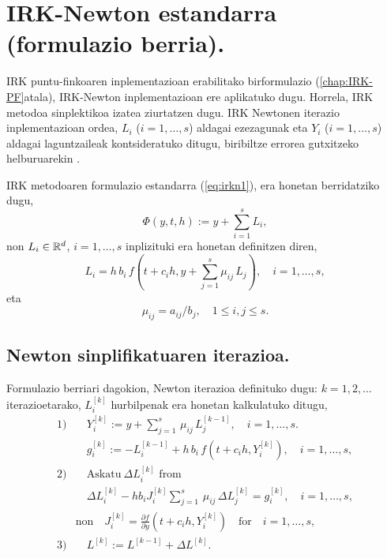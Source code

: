 \section{IRK-Newton estandarra (formulazio berria).}
\label{sec:7.4}

IRK puntu-finkoaren inplementazioan erabilitako birformulazio (\ref{chap:IRK-PF}atala), IRK-Newton inplementazioan ere aplikatuko dugu. Horrela, IRK metodoa sinplektikoa izatea ziurtatzen dugu. IRK Newtonen iterazio inplementazioan ordea, $L_i$ ($i=1,\dots,s$) aldagai ezezagunak eta $Y_i$ ($i=1,\dots,s$) aldagai laguntzaileak kontsideratuko ditugu, biribiltze errorea gutxitzeko helburuarekin \cite{Olsson2000}.

IRK metodoaren formulazio estandarra (\ref{eq:irkn1}), era honetan berridatziko dugu,
\begin{equation}
\label{eq:PhiIRK2}
\Phi(y,t,h) :=y + \sum_{i=1}^s L_{i},
\end{equation}
%
non $L_{i} \in \mathbb{R}^d$, $i=1,\ldots,s$ inplizituki era honetan definitzen diren,
%
\begin{equation}
\label{eq:L}
 L_{i} = h \, b_i \, f(t+c_i h, y+ \sum_{j=1}^s \mu_{ij}\,L_{j}), \quad  i=1 ,\ldots, s, 
\end{equation}
%
eta
%
\begin{equation*} 
\mu_{ij}=a_{ij}/b_j,  \quad 1 \leq i,j \leq s.
\end{equation*}
%
\subsection*{Newton sinplifikatuaren iterazioa.}

Formulazio berriari dagokion, Newton iterazioa definituko dugu:  $k=1,2,\dots$ iterazioetarako, $L_i^{[k]}$ hurbilpenak era honetan kalkulatuko ditugu,
\begin{equation}
\label{eq:Newton_iteration2}
\begin{split}
1) 
   & \quad Y_i^{[k]} := y+\sum_{j=1}^{s}\, \mu_{ij}\, L_{j}^{[k-1]}, \quad  i=1 ,\ldots, s. \\
   & \quad g_i^{[k]} := -L_{i}^{[k-1]}  + h \, b_i\, f(t+c_i h,  Y_i^{[k]}), \quad  i=1 ,\ldots, s, \\   
2) & \quad \mathrm{Askatu \ } \Delta L_{i}^{[k]} \mbox{\  from \ } \\
   & \quad \Delta L_{i}^{[k]}  - h b_i J_i^{[k]} \sum_{j=1}^{s}\, \mu_{ij} \, \Delta L_{j}^{[k]}=g_i^{[k]}, \quad  i=1 ,\ldots, s,  \\
& \mbox{non} \quad  J_i^{[k]}=\frac{\partial f}{\partial y}(t + c_i h,Y_{i}^{[k]}) \quad	\mbox{for} \quad  i=1,\ldots, s,  \\
3) 
   & \quad   L^{[k]} := L^{[k-1]}  + \Delta L^{[k]}.
   \end{split}
\end{equation}

